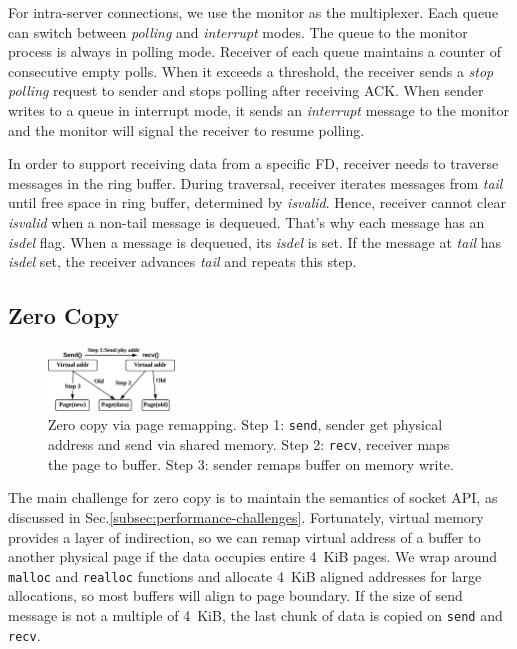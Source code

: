 For intra-server connections, we use the monitor as the multiplexer. Each queue can switch between \textit{polling} and \textit{interrupt} modes. The queue to the monitor process is always in polling mode. Receiver of each queue maintains a counter of consecutive empty polls. When it exceeds a threshold, the receiver sends a \textit{stop polling} request to sender and stops polling after receiving ACK. When sender writes to a queue in interrupt mode, it sends an \textit{interrupt} message to the monitor and the monitor will signal the receiver to resume polling. 

In order to support receiving data from a specific FD, receiver needs to traverse messages in the ring buffer. During traversal, receiver iterates messages from \textit{tail} until free space in ring buffer, determined by \textit{isvalid}. Hence, receiver cannot clear \textit{isvalid} when a non-tail message is dequeued. That's why each message has an \textit{isdel} flag. When a message is dequeued, its \textit{isdel} is set. If the message at \textit{tail} has \textit{isdel} set, the receiver advances \textit{tail} and repeats this step.

\subsection{Zero Copy}
\label{subsec:zerocopy}

\begin{figure}[t]
	\centering
	\includegraphics[width=0.3\textwidth]{images/zerocopy}
	\caption{Zero copy via page remapping. Step 1: \texttt{send}, sender get physical address and send via shared memory. Step 2: \texttt{recv}, receiver maps the page to buffer. Step 3: sender remaps buffer on memory write.}
	\vspace{-15pt}
	\label{fig:zerocopy}
\end{figure}

The main challenge for zero copy is to maintain the semantics of socket API, as discussed in Sec.\ref{subsec:performance-challenges}.
Fortunately, virtual memory provides a layer of indirection, so we can remap virtual address of a buffer to another physical page if the data occupies entire 4~KiB pages.
We wrap around \texttt{malloc} and \texttt{realloc} functions and allocate 4~KiB aligned addresses for large allocations, so most buffers will align to page boundary.
If the size of send message is not a multiple of 4~KiB, the last chunk of data is copied on \texttt{send} and \texttt{recv}.

